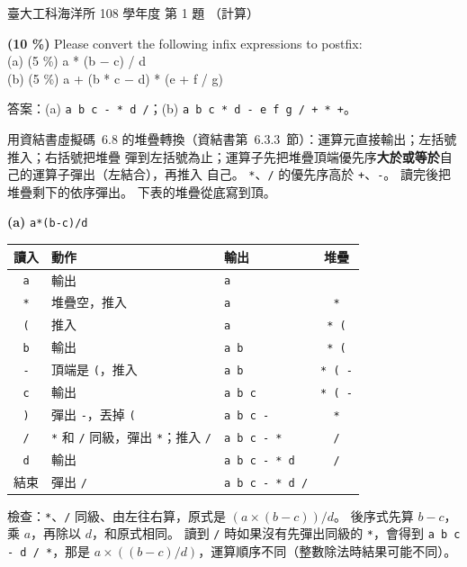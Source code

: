 \begin{pastexam}[label={px:ntu-108-esoe-ds-01}]{臺大工科海洋所 108 學年度 第 1 題}
（計算）

\textbf{(10 \%)} Please convert the following infix expressions to postfix:\\
(a) (5 \%) a * (b $-$ c) / d\\
(b) (5 \%) a + (b * c $-$ d) * (e + f / g)
\end{pastexam}

\begin{pastsoln}
答案：(a) \texttt{a b c - * d /}；(b) \texttt{a b c * d - e f g / + * +}。

用資結書虛擬碼~6.8 的堆疊轉換（資結書第~6.3.3~節）：運算元直接輸出；左括號推入；右括號把堆疊
彈到左括號為止；運算子先把堆疊頂端優先序\textbf{大於或等於}自己的運算子彈出（左結合），再推入
自己。 \texttt{*}、\texttt{/} 的優先序高於 \texttt{+}、\texttt{-}。 讀完後把堆疊剩下的依序彈出。
下表的堆疊從底寫到頂。

\textbf{(a)} \texttt{a*(b-c)/d}
\begin{center}
\small
\begin{tabular}{cllc}
\toprule
讀入 & 動作 & 輸出 & 堆疊 \\
\midrule
\texttt{a} & 輸出 & \texttt{a} & \\
\texttt{*} & 堆疊空，推入 & \texttt{a} & \texttt{*} \\
\texttt{(} & 推入 & \texttt{a} & \texttt{* (} \\
\texttt{b} & 輸出 & \texttt{a b} & \texttt{* (} \\
\texttt{-} & 頂端是 \texttt{(}，推入 & \texttt{a b} & \texttt{* ( -} \\
\texttt{c} & 輸出 & \texttt{a b c} & \texttt{* ( -} \\
\texttt{)} & 彈出 \texttt{-}，丟掉 \texttt{(} & \texttt{a b c -} & \texttt{*} \\
\texttt{/} & \texttt{*} 和 \texttt{/} 同級，彈出 \texttt{*}；推入 \texttt{/} & \texttt{a b c - *} & \texttt{/} \\
\texttt{d} & 輸出 & \texttt{a b c - * d} & \texttt{/} \\
結束 & 彈出 \texttt{/} & \texttt{a b c - * d /} & \\
\bottomrule
\end{tabular}
\end{center}
檢查：\texttt{*}、\texttt{/} 同級、由左往右算，原式是 $(a \times (b - c)) / d$。 後序式先算 $b - c$，
乘 $a$，再除以 $d$，和原式相同。 讀到 \texttt{/} 時如果沒有先彈出同級的 \texttt{*}，會得到
\texttt{a b c - d / *}，那是 $a \times ((b - c)/d)$，運算順序不同（整數除法時結果可能不同）。


\end{pastsoln}

